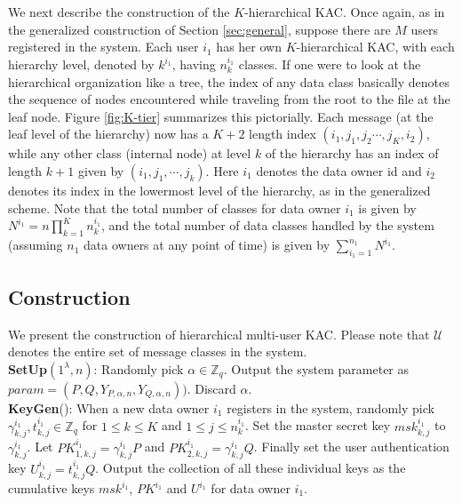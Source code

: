 We next describe the construction of the $K$-hierarchical KAC. Once again, as in the generalized construction of Section \ref{sec:general}, suppose there are $M$ users registered in the system. Each user $i_1$ has her own $K$-hierarchical KAC, with each hierarchy level, denoted by $k^{i_1}$, having $n^{i_1}_{k}$ classes. If one were to look at the hierarchical organization like a tree, the index of any data class basically denotes the sequence of nodes encountered while traveling from the root to the file at the leaf node. Figure \ref{fig:K-tier} summarizes this pictorially. Each message (at the leaf level of the hierarchy) now has a $K+2$ length index $(i_1,j_1,j_2\cdots,j_K,i_2)$, while any other class (internal node) at level $k$ of the hierarchy has an index of length $k+1$ given by $(i_1,j_1,\cdots,j_k)$. Here $i_1$ denotes the data owner id and $i_2$ denotes its index in the lowermost level of the hierarchy, as in the generalized scheme. Note that the total number of classes for data owner $i_1$ is given by $N^{i_1}=n\prod_{k=1}^{K}n^{i_1}_{k}$, and the total number of data classes handled by the system (assuming $n_1$ data owners at any point of time) is given by $\sum_{i_1=1}^{n_1}N^{i_1}$.

\subsection{Construction}
\label{subsec:construction_hierarchical}

We present the construction of hierarchical multi-user KAC. Please note that $\mathcal{U}$ denotes the entire set of message classes in the system.\\

\noindent \textbf{SetUp}$(1^{\lambda},n)$: Randomly pick $\alpha \in \mathbb{Z}_q$. Output the system parameter as $param = (P,Q,Y_{P,\alpha,n},Y_{Q,\alpha,n}))$. Discard $\alpha$. \\

\noindent \textbf{KeyGen}(): When a new data owner $i_1$ registers in the system, randomly pick $\gamma^{i_1}_{k,j}, t^{i_1}_{k,j} \in \mathbb{Z}_q$ for $1\leq k\leq K$ and $1\leq j \leq n^{i_1}_k$. Set the master secret key $msk^{i_1}_{k,j}$ to $\gamma^{i_1}_{k,j}$. Let $PK^{i_1}_{1,k,j}=\gamma^{i_1}_{k,j} P$ and $PK^{i_1}_{2,k,j}=\gamma^{i_1}_{k,j} Q$. Finally set the user authentication key $U^{i_1}_{k,j}=t^{i_1}_{k,j}Q$. Output the collection of all these individual keys as the cumulative keys $msk^{i_1}$, $PK^{i_1}$ and $U^{i_1}$ for data owner $i_1$.\\

